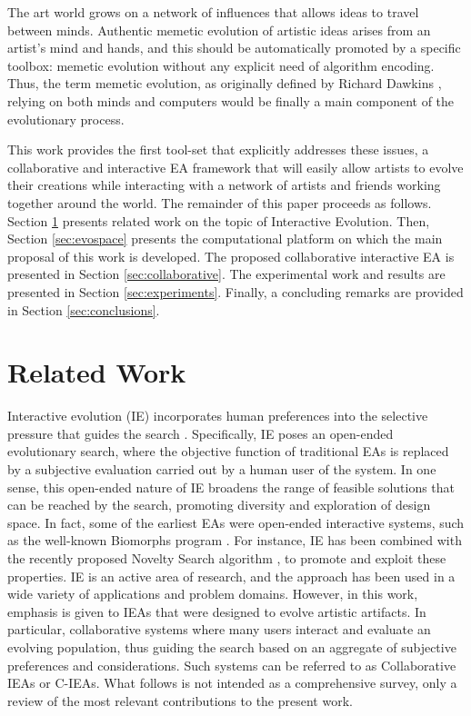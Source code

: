 \documentclass{llncs}
\begin{document}
The art world grows on a network of influences that allows ideas to travel between minds.
Authentic memetic  %
evolution of artistic ideas arises from an artist's mind and hands, and this should be automatically promoted by a specific toolbox:
memetic evolution without any explicit need of algorithm encoding.
Thus, the term memetic evolution, as originally defined by Richard Dawkins \cite{r.dawkins1976the-selfish-gen}, relying on both minds and computers
would be finally a main component of the evolutionary process.

This work provides the first tool-set that explicitly addresses these issues, a collaborative and interactive EA framework that will easily
allow artists to evolve their creations while interacting
with a network of artists and friends working together around the world.
The remainder of this paper proceeds as follows.
Section \ref{sec:interactive} presents related work on the topic of Interactive Evolution.
Then, Section \ref{sec:evospace} presents the computational platform on which the main proposal of this work is developed.
The proposed collaborative interactive EA is presented in Section \ref{sec:collaborative}.
The experimental work and results are presented in Section \ref{sec:experiments}.
Finally, a concluding remarks are provided in Section \ref{sec:conclusions}.


\section{Related Work}
\label{sec:interactive}
Interactive evolution (IE) incorporates human preferences into the selective pressure that guides the search \cite{ie1,ie2}.
Specifically, IE poses an open-ended evolutionary search, where the objective function of traditional EAs is replaced by a subjective evaluation carried out by a human user of the system.
In one sense, this open-ended nature of IE  broadens the range of feasible solutions that can be reached by the search,
promoting diversity and exploration of design space.
In fact, some of the earliest EAs were open-ended interactive systems, such as the well-known Biomorphs program \cite{biomorphs}.
For instance, IE has been combined with the recently proposed Novelty Search algorithm \cite{ns:2012}, to promote and exploit these properties. IE is an active area of research, and the approach has been used in a wide variety of applications and problem domains.
However, in this work, emphasis is given to IEAs that were designed to evolve artistic artifacts.
In particular, collaborative systems where many users interact and evaluate an evolving population,
thus guiding the search based on an aggregate of subjective preferences and considerations.
Such systems can be referred to as Collaborative IEAs or C-IEAs.
What follows is not intended as a comprehensive survey, only a review of the most relevant contributions to the present work.
\end{document}
